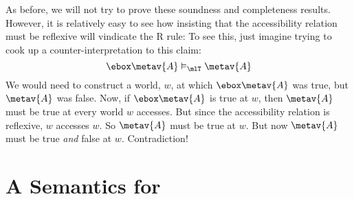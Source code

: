 As before, we will not try to prove these soundness and completeness results. However, it is relatively easy to see how insisting that the accessibility relation must be reflexive will vindicate the R\mlT{} rule:
To see this, just imagine trying to cook up a counter-interpretation to this claim:
\[
	\ebox \metav{A}\entails_\mlT \metav{A}
\]
We would need to construct a world, $w$, at which $\ebox \metav{A}$ was true, but $\metav{A}$ was false. Now, if $\ebox \metav{A}$ is true at $w$, then $\metav{A}$ must be true at every world $w$ accesses. But since the accessibility relation is reflexive, $w$ accesses $w$. So $\metav{A}$ must be true at $w$. But now $\metav{A}$ must be true \emph{and} false at $w$. Contradiction!

\section{A Semantics for \mlSfour}
\label{SemanticsS4}

